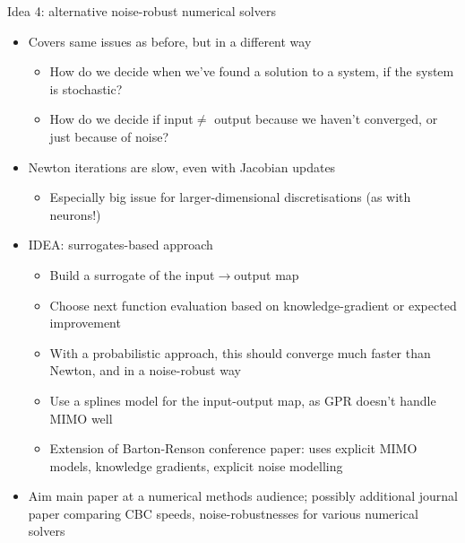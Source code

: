 \documentclass[presentation]{beamer}
\begin{document}
\begin{frame}[<+->][label={sec:orgddc6ff7},plain]{Idea 4: alternative noise-robust numerical solvers}
\begin{itemize}
\item Covers same issues as before, but in a different way
\begin{itemize}
\item How do we decide when we've found a solution to a system, if the system is stochastic?
\item How do we decide if input\(\neq\) output because we haven't converged, or just because of noise?
\end{itemize}
\end{itemize}
\vfill
\begin{itemize}
\item Newton iterations are slow, even with Jacobian updates
\begin{itemize}
\item Especially big issue for larger-dimensional discretisations (as with neurons!)
\end{itemize}
\item IDEA: surrogates-based approach
\begin{itemize}
\item Build a surrogate of the input\(\to\)output map
\item Choose next function evaluation based on knowledge-gradient or expected improvement
\item With a probabilistic approach, this should converge much faster than Newton, and in a noise-robust way
\item Use a splines model for the input-output map, as GPR doesn't handle MIMO well
\item Extension of Barton-Renson conference paper: uses explicit MIMO models, knowledge gradients, explicit noise modelling
\end{itemize}
\item Aim main paper at a numerical methods audience; possibly additional journal paper comparing CBC speeds, noise-robustnesses for various numerical solvers
\end{itemize}
\end{frame}
\end{document}

